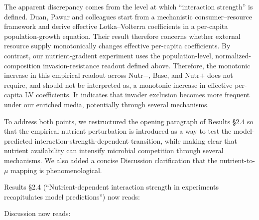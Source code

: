 \responselabel
The apparent discrepancy comes from the level at which ``interaction strength'' is defined. Duan, Pawar and colleagues start from a mechanistic consumer--resource framework and derive effective Lotka--Volterra coefficients in a per-capita population-growth equation. Their result therefore concerns whether external resource supply monotonically changes effective per-capita coefficients. By contrast, our nutrient-gradient experiment uses the population-level, normalized-composition invasion-resistance readout defined above. Therefore, the monotonic increase in this empirical readout across Nutr$-$, Base, and Nutr$+$ does not require, and should not be interpreted as, a monotonic increase in effective per-capita LV coefficients. It indicates that invader exclusion becomes more frequent under our enriched media, potentially through several mechanisms.

To address both points, we restructured the opening paragraph of Results \S2.4 so that the empirical nutrient perturbation is introduced as a way to test the model-predicted interaction-strength-dependent transition, while making clear that nutrient availability can intensify microbial competition through several mechanisms. We also added a concise Discussion clarification that the nutrient-to-$\mu$ mapping is phenomenological.

Results \S2.4 (``Nutrient-dependent interaction strength in experiments recapitulates model predictions'') now reads: 

Discussion now reads: 


